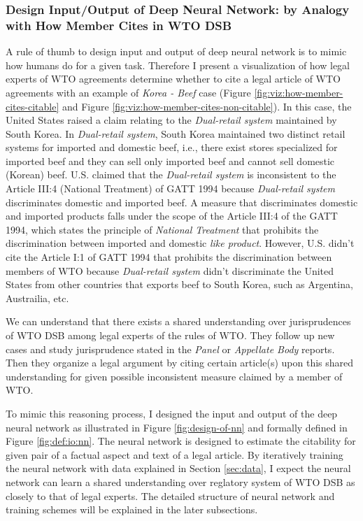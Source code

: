 \documentclass[12pt,letterpaper]{article}
\begin{document}
\subsubsection{Design Input/Output of Deep Neural Network: by Analogy with How Member Cites in WTO DSB} \label{design:io}
A rule of thumb to design input and output of deep neural network is to mimic
how humans do for a given task.
Therefore I present a visualization of how legal experts of WTO agreements determine whether to cite a legal article of WTO agreements with an example of \textit{Korea - Beef} case (Figure \ref{fig:viz:how-member-cites-citable} and Figure \ref{fig:viz:how-member-cites-non-citable}).
In this case, the United States raised a claim relating to the \textit{Dual-retail system} maintained by South Korea. In \textit{Dual-retail system}, South Korea maintained two distinct retail systems
for imported and domestic beef, i.e., there exist stores specialized for imported beef and they can sell only imported beef and cannot sell domestic (Korean) beef. U.S. claimed that the \textit{Dual-retail system} is inconsistent to the Article III:4 (National Treatment) of GATT 1994
because \textit{Dual-retail system} discriminates domestic and imported beef. A measure that discriminates domestic and imported products falls under the scope of the Article III:4 of the GATT 1994, which states the principle of \textit{National Treatment} that prohibits the discrimination between imported and domestic \textit{like product}. However, U.S. didn't
cite the Article I:1 of GATT 1994 that prohibits the discrimination between members of WTO
because \textit{Dual-retail system} didn't discriminate the United States from other countries that exports beef to South Korea, such as Argentina, Austrailia, etc.

We can understand that there exists a shared understanding over jurisprudences of WTO DSB among legal experts of the rules of WTO. They follow up new cases and study jurisprudence stated in the \textit{Panel} or  \textit{Appellate Body} reports.
Then they organize a legal argument by citing certain article(s) upon this shared understanding for given possible inconsistent measure claimed by a member of WTO.

To mimic this reasoning process, I designed the input and output of the deep neural network as illustrated in Figure \ref{fig:design-of-nn} and formally defined in Figure \ref{fig:def:io:nn}.
The neural network is designed to estimate the citability for given pair of a factual aspect and text of a legal article.
By iteratively training the neural network with data explained in Section \ref{sec:data}, I expect the neural network can learn a shared understanding over reglatory system of WTO DSB as closely to that of legal experts.
The detailed structure of neural network and training schemes will be explained in the later subsections.
\clearpage

\end{document}
